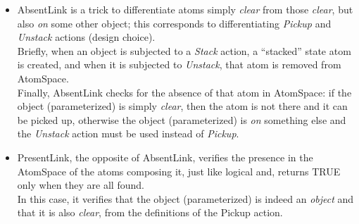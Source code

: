 \begin{itemize}
	\item AbsentLink is a trick to differentiate atoms simply \textit{clear} from those \textit{clear}, but also \textit{on} some other object; this corresponds to differentiating \textit{Pickup} and \textit{Unstack} actions (design choice). \\
Briefly, when an object is subjected to a \textit{Stack} action, a \enquote{stacked} state atom is created, and when it is subjected to \textit{Unstack}, that atom is removed from AtomSpace. \\
Finally, AbsentLink checks for the absence of that atom in AtomSpace: if the object (parameterized) is simply \textit{clear}, then the atom is not there and it can be picked up, otherwise the object (parameterized) is \textit{on} something else and the \textit{Unstack} action must be used instead of \textit{Pickup}. 
	\item PresentLink, the opposite of AbsentLink, verifies the presence in the AtomSpace of the atoms composing it, just like logical and, returns TRUE only when they are all found. \\
In this case, it verifies that the object (parameterized) is indeed an \textit{object} and that it is also \textit{clear}, from the definitions of the Pickup action.
\end{itemize}

